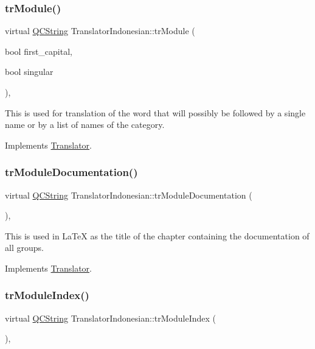 \subsubsection{\texorpdfstring{trModule()}{trModule()}}
{\footnotesize\ttfamily virtual \mbox{\hyperlink{class_q_c_string}{Q\+C\+String}} Translator\+Indonesian\+::tr\+Module (\begin{DoxyParamCaption}\item[{bool}]{first\+\_\+capital,  }\item[{bool}]{singular }\end{DoxyParamCaption})\hspace{0.3cm}{\ttfamily [inline]}, {\ttfamily [virtual]}}

This is used for translation of the word that will possibly be followed by a single name or by a list of names of the category. 

Implements \mbox{\hyperlink{class_translator}{Translator}}.

\mbox{\label{class_translator_indonesian_af24eae2d60a660582df69ac0e19d5a3b}} 
\subsubsection{\texorpdfstring{trModuleDocumentation()}{trModuleDocumentation()}}
{\footnotesize\ttfamily virtual \mbox{\hyperlink{class_q_c_string}{Q\+C\+String}} Translator\+Indonesian\+::tr\+Module\+Documentation (\begin{DoxyParamCaption}{ }\end{DoxyParamCaption})\hspace{0.3cm}{\ttfamily [inline]}, {\ttfamily [virtual]}}

This is used in La\+TeX as the title of the chapter containing the documentation of all groups. 

Implements \mbox{\hyperlink{class_translator}{Translator}}.

\mbox{\label{class_translator_indonesian_a3da453dcb191628cdfcf4258b78d6b92}} 
\subsubsection{\texorpdfstring{trModuleIndex()}{trModuleIndex()}}
{\footnotesize\ttfamily virtual \mbox{\hyperlink{class_q_c_string}{Q\+C\+String}} Translator\+Indonesian\+::tr\+Module\+Index (\begin{DoxyParamCaption}{ }\end{DoxyParamCaption})\hspace{0.3cm}{\ttfamily [inline]}, {\ttfamily [virtual]}}

